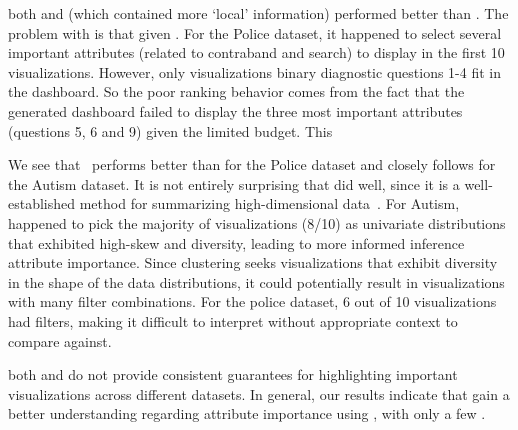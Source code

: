 \par 
{}
both \system and \cluster (which contained more `local' information) 
performed better than \BFS. 
The problem with \BFS is that given 
. 
For the Police dataset, it happened to select several  
important attributes (related to contraband and search) 
to display in the first 10 visualizations. 
However,  
only visualizations  
binary diagnostic 
questions 1-4 fit in the dashboard. 
So the poor ranking behavior comes from the fact that 
the \BFS generated dashboard failed to display 
the three most important attributes (questions 5, 6 and 9) 
given the limited budget. 
This 

\par We see that \system\ performs better 
than \cluster for the Police dataset 
and closely follows \cluster for the Autism dataset. 
It is not entirely surprising that \cluster did well, 
since it is a well-established method for 
summarizing high-dimensional data~\cite{Han2005}. 
For Autism, \cluster happened to pick the majority of visualizations (8/10) as univariate distributions that exhibited high-skew and diversity, 
leading to more informed inference  attribute importance. 
Since clustering seeks visualizations 
that exhibit diversity in the shape of the data distributions, 
it could potentially result in visualizations with many filter combinations. 
For the police dataset, 6 out of 10 visualizations had 
 filters, 
making it difficult to interpret  
without  appropriate context to compare against.

\par {} both \BFS and \cluster 
do not provide consistent guarantees for highlighting important visualizations across different datasets. In general, our results indicate that  gain a better  understanding regarding attribute importance using \system, with only a few .
